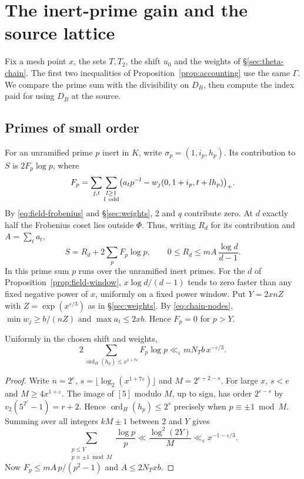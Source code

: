 \section{The inert-prime gain and the source lattice}\label{sec:inert-gain}

Fix a mesh point $x$, the sets $T,T_2$, the shift $u_0$ and the weights
of \S\ref{sec:theta-chain}. The first two inequalities of
Proposition~\ref{prop:accounting} use the same $\Gamma$. We compare
the prime sum with the divisibility on $D_B$, then compute the index
paid for using $D_B$ at the source.

\subsection{Primes of small order}

For an unramified prime $p$ inert in $K$, write
$\sigma_p=(1,i_p,h_p)$. Its contribution to $S$ is $2F_p\log p$, where
\[
 F_p=\sum_{j,t}\sum_{\substack{l\ge1\\l\ {\rm odd}}}
 \bigl(a_t p^{-l}-w_j(0,1+i_p,t+lh_p)\bigr)_+ .
\]
By \eqref{eq:field-frobenius} and \S\ref{sec:weights}, $2$ and $q$
contribute zero. At $d$ exactly half the Frobenius coset lies outside
$\Phi$. Thus, writing $R_d$ for its contribution and $A=\sum_ta_t$,
\begin{equation}\label{eq:loss-prime-sum}
 S=R_d+2\sum_p F_p\log p,\qquad
 0\le R_d\le mA\,\frac{\log d}{d-1}.
\end{equation}
In this prime sum $p$ runs over the unramified inert primes. For the $d$
of Proposition~\ref{prop:field-window}, $x\log d/(d-1)$ tends to zero
faster than any fixed negative power of $x$, uniformly on a fixed power window.
Put $Y=2xnZ$ with $Z=\exp(x^{\varepsilon/3})$ as in \S\ref{sec:weights}.
By \eqref{eq:chain-nodes}, $\min w_j\ge b/(nZ)$ and $\max a_t\le2xb$.
Hence $F_p=0$ for $p>Y$.

\begin{proposition}\label{prop:loss-short}
Uniformly in the chosen shift and weights,
\[
 2\sum_{\operatorname{ord}_H(h_p)\le x^{1+7\varepsilon}}
       F_p\log p\ll_\varepsilon mN_T b\,x^{-\varepsilon/3}.
\]
\end{proposition}

\begin{proof}
Write $n=2^e$, $s=\lfloor\log_2(x^{1+7\varepsilon})\rfloor$ and
$M=2^{e+2-s}$. For large $x$, $s<e$ and $M\ge4x^{1+\varepsilon}$.
The image of $[5]$ modulo $M$, up to sign, has order $2^{e-s}$
by $v_2(5^{2^r}-1)=r+2$. Hence $\operatorname{ord}_H(h_p)\le2^s$
precisely when $p\equiv\pm1\bmod M$. Summing over all integers
$kM\pm1$ between $2$ and $Y$ gives
\[
 \sum_{\substack{p\le Y\\p\equiv\pm1\bmod M}}\frac{\log p}{p}
 \ll\frac{\log^2(2Y)}{M}\ll_\varepsilon x^{-1-\varepsilon/3}.
\]
Now $F_p\le mA\,p/(p^2-1)$ and $A\le2N_Txb$.
\end{proof}

